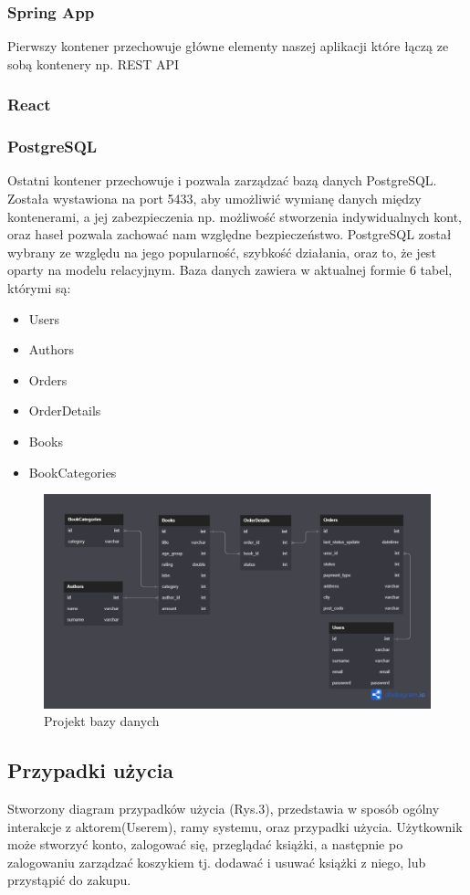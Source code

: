 \documentclass[]{article}
\begin{document}
\subsubsection{Spring App}
Pierwszy kontener przechowuje główne elementy naszej aplikacji które łączą ze sobą kontenery np. REST API
\subsubsection{React}
\subsubsection{PostgreSQL}
Ostatni kontener przechowuje i pozwala zarządzać bazą danych PostgreSQL. Została wystawiona na port 5433, aby umożliwić wymianę danych między kontenerami, a jej zabezpieczenia np. możliwość stworzenia indywidualnych kont, oraz haseł pozwala zachować nam względne bezpieczeństwo. PostgreSQL został wybrany ze względu na jego popularność, szybkość działania, oraz to, że jest oparty na modelu relacyjnym.
Baza danych zawiera w aktualnej formie 6 tabel, którymi są:
\begin{itemize}
	\item Users
	\item Authors
	\item Orders
	\item OrderDetails
	\item Books
	\item BookCategories
\end{itemize}
\begin{figure}[h]
	\centering
	\includegraphics[scale=0.35]{../../DbDiagram.png}
	\caption{Projekt bazy danych}
\end{figure}

\subsection{Przypadki użycia}
Stworzony diagram przypadków użycia (Rys.3), przedstawia w sposób ogólny interakcje z aktorem(Userem), ramy systemu, oraz przypadki użycia. Użytkownik może stworzyć konto, zalogować się, przeglądać książki, a następnie po zalogowaniu zarządzać koszykiem tj. dodawać i usuwać książki z niego, lub przystąpić do zakupu.
\end{document}

